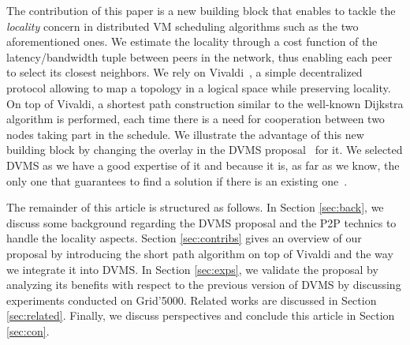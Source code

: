 The contribution of this paper is a new building block that enables to tackle the
\emph{locality} concern in distributed VM scheduling algorithms such as the two
aforementioned ones.
We estimate the locality through a cost function of the latency/bandwidth tuple between
peers in the network, thus enabling each peer to select its closest neighbors. We rely on
Vivaldi~\cite{dabek:2001:sigcomm04}, a simple decentralized protocol allowing to map a
topology in a logical space while preserving locality. On top of Vivaldi, a shortest path
construction similar to the well-known Dijkstra algorithm is performed, each time there is
a need for cooperation between two nodes taking part in the schedule. We illustrate the
advantage of this new building block by changing the overlay in the DVMS
proposal~\cite{quesnel:cpe2012} for it. We selected DVMS as we have a good expertise of it and
because it is, as far as we know, the only one that guarantees to find a solution if there
is an existing one~\cite{quesnel:ispa2013}.
                                                   
The remainder of this article is structured as follows. In Section \ref{sec:back}, we
discuss some background regarding the DVMS proposal and the P2P technics to handle
the locality aspects. Section \ref{sec:contribs} gives an overview of our proposal by
introducing the short path algorithm on top of Vivaldi and the way we integrate it into
DVMS. In Section \ref{sec:exps}, we validate the proposal by analyzing its benefits with
respect to the previous version of DVMS by discussing experiments conducted on
Grid'5000. Related works are discussed in Section \ref{sec:related}. Finally, we discuss
perspectives and conclude this article in Section \ref{sec:con}.

